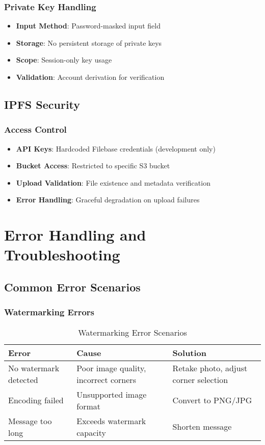 \documentclass[12pt,a4paper]{article}
\begin{document}
\subsubsection{Private Key Handling}
\begin{itemize}
    \item \textbf{Input Method}: Password-masked input field
    \item \textbf{Storage}: No persistent storage of private keys
    \item \textbf{Scope}: Session-only key usage
    \item \textbf{Validation}: Account derivation for verification
\end{itemize}

\subsection{IPFS Security}

\subsubsection{Access Control}
\begin{itemize}
    \item \textbf{API Keys}: Hardcoded Filebase credentials (development only)
    \item \textbf{Bucket Access}: Restricted to specific S3 bucket
    \item \textbf{Upload Validation}: File existence and metadata verification
    \item \textbf{Error Handling}: Graceful degradation on upload failures
\end{itemize}

\section{Error Handling and Troubleshooting}

\subsection{Common Error Scenarios}

\subsubsection{Watermarking Errors}
\begin{table}[H]
\centering
\begin{tabular}{@{}p{4cm}p{6cm}p{4cm}@{}}
\toprule
\textbf{Error} & \textbf{Cause} & \textbf{Solution} \\
\midrule
No watermark detected & Poor image quality, incorrect corners & Retake photo, adjust corner selection \\
Encoding failed & Unsupported image format & Convert to PNG/JPG \\
Message too long & Exceeds watermark capacity & Shorten message \\
\bottomrule
\end{tabular}
\caption{Watermarking Error Scenarios}
\end{table}
\end{document}

